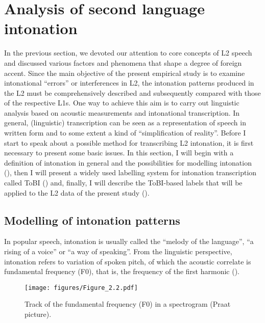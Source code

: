\section{Analysis of second language intonation}\label{sec:2.2}

In the previous section, we devoted our attention to core concepts of L2 speech and discussed various factors and phenomena that shape a degree of foreign accent. Since the main objective of the present empirical study is to examine intonational “errors” or interferences in L2, the intonation patterns produced in the L2 must be comprehensively described and subsequently compared with those of the respective L1s. One way to achieve this aim is to carry out linguistic analysis based on acoustic measurements and intonational transcription. In general, (linguistic) transcription can be seen as a representation of speech in written form and to some extent a kind of “simplification of reality”. Before I start to speak about a possible method for transcribing L2 intonation, it is first necessary to present some basic issues. In this section, I will begin with a definition of intonation in general and the possibilities for modelling intonation (), then I will present a widely used labelling system for intonation transcription called ToBI () and, finally, I will describe the ToBI-based labels that will be applied to the L2 data of the present study ().

\subsection{Modelling of intonation patterns}\label{sec:2.2.1} %

In popular speech, intonation is usually called the “melody of the language”, “a rising of a voice” or “a way of speaking”. From the linguistic perspective, intonation refers to variation of spoken pitch, of which the acoustic correlate is fundamental frequency (F0), that is, the frequency of the first harmonic ().



\begin{figure}
\texttt{[image: figures/Figure\_2.2.pdf]}
\caption{Track of the fundamental frequency (F0) in a spectrogram (Praat picture).}
\label{fig:2.2}
\end{figure}


